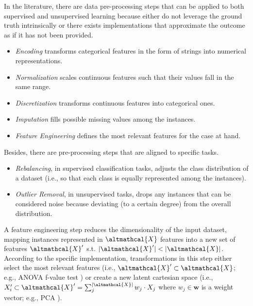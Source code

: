 In the literature, there are data pre-processing steps that can be applied to both supervised and unsupervised learning because either do not leverage the ground truth intrinsically or there exists implementations that approximate the outcome as if it has not been provided.
\begin{itemize}
    \item \textit{Encoding} transforms categorical features in the form of strings into numerical representations.
    \item \textit{Normalization} scales continuous features such that their values fall in the same range.
    \item \textit{Discretization} transforms continuous features into categorical ones.
    \item \textit{Imputation} fills possible missing values among the instances.
    \item \textit{Feature Engineering} defines the most relevant features for the case at hand.
\end{itemize}

Besides, there are pre-processing steps that are aligned to specific tasks.
\begin{itemize}
    \item \textit{Rebalancing}, in supervised classification tasks, adjusts the class distribution of a dataset (i.e., so that each class is equally represented among the instances).
    \item \textit{Outlier Removal}, in unsupervised tasks, drops any instances that can be considered noise because deviating (to a certain degree) from the overall distribution.
\end{itemize}

\begin{example}
    A feature engineering step reduces the dimensionality of the input dataset, mapping instances represented in $\altmathcal{X}$ features into a new set of features  $\altmathcal{X}'$ s.t.  $|\altmathcal{X}'| < |\altmathcal{X}|$.
    According to the specific implementation, transformations in this step either select the most relevant features (i.e., $\altmathcal{X}' \subset \altmathcal{X}$; e.g., ANOVA f-value test \cite{}) or create a new latent cartesian space (i.e., $X'_{i} \subset \altmathcal{X}' = \sum_{j}^{|\altmathcal{X}|} w_j \cdot X_j$ where $w_j \in \pmb{w}$ is a weight vector; e.g., PCA \cite{}).
\end{example}

